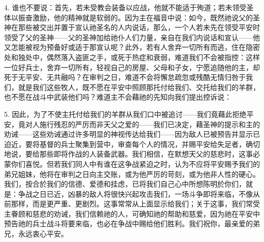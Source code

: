 4. 谁也不要说：首先，若未受教会装备以应战，他就不能适于殉道；若未领受圣体以振奋激励，他的精神就是软弱的。因为主在福音中说：如今，既然祂说父的圣神在那些被交出并置于宣认祂圣名的人内说话，那么，一个人若未先在领受平安时领受了父的圣神——父的圣神加给祂仆人们力量，亲自在我们内说话和宣认——他又怎能被视为预备好或适于那宣认呢？此外，若有人舍弃一切所有而逃，住在隐密处和独处中，偶然落入盗匪之手，或死于热症和衰弱，难道我们不会被指控：这样一位好兵士，舍弃一切所有，轻视自己的房屋、父母和子女，宁愿追随他的主，却死于无平安、无共融吗？在审判之日，难道不会将懈怠疏忽或残酷无情归咎于我们，就是我们这些牧人，既不愿在平安中照顾那托付给我们、交托给我们的羊群，也不愿在战斗中武装他们吗？难道主不会藉祂的先知向我们提出控诉说：\par

5. 因此，为了不使主托付给我们的羊群从我们口中被追讨——我们竟藉此拒绝平安，竟对人施行残忍的严厉而非天父之爱的——我们已决定，藉圣神的提示和主的劝诫——这些劝诫通过许多明显的神视传达给我们——因为敌人已被预告并显示已迫近，要将基督的兵士聚集到营中，审查每个人的情况，并赐平安给失足者，确切地说，要给那些即将作战的人装备武器。我们相信，在默想天父的慈悲时，这事必蒙你们喜悦。但若我们同人中有谁在这争战紧迫之时，认为不应将平安赐予我们的弟兄姐妹，他将在审判之日向主交账，或为他严厉的苛刻，或为他非人性的硬心。我们，按合於我们的信德、爱德和挂虑，已将我们自己心中所想陈明於你们，就是：争战之日已近，凶暴的敌人将很快兴起攻击我们，一场斗争即将来临，不像从前那样，而是更严重、更剧烈。这事常常从上面显示给我们；关于这事，我们常受主眷顾和慈悲的劝诫，我们信赖祂的人，可确知祂的帮助和慈爱，因为祂在平安中预告祂的兵士战斗将要来临，也必在争战中赐给他们胜利。我们祝你，最亲爱的弟兄，永远衷心平安。\par


